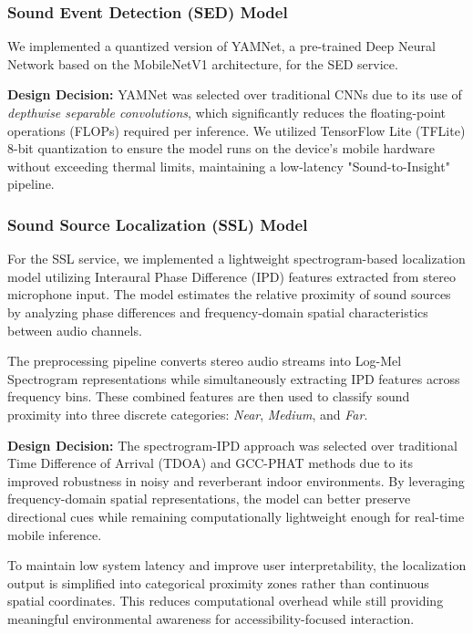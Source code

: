 \subsubsection{Sound Event Detection (SED) Model}
We implemented a quantized version of YAMNet, a pre-trained Deep Neural Network based on the MobileNetV1 architecture, for the SED service. 

\textbf{Design Decision:} YAMNet was selected over traditional CNNs due to its use of \textit{depthwise separable convolutions}, which significantly reduces the floating-point operations (FLOPs) required per inference. We utilized TensorFlow Lite (TFLite) 8-bit quantization to ensure the model runs on the device’s mobile hardware without exceeding thermal limits, maintaining a low-latency "Sound-to-Insight" pipeline.

\subsubsection{Sound Source Localization (SSL) Model}

For the SSL service, we implemented a lightweight spectrogram-based localization model utilizing Interaural Phase Difference (IPD) features extracted from stereo microphone input. 
The model estimates the relative proximity of sound sources by analyzing phase differences and frequency-domain spatial characteristics between audio channels.

The preprocessing pipeline converts stereo audio streams into Log-Mel Spectrogram representations while simultaneously extracting IPD features across frequency bins. 
These combined features are then used to classify sound proximity into three discrete categories: \textit{Near}, \textit{Medium}, and \textit{Far}.

\textbf{Design Decision:} 
The spectrogram-IPD approach was selected over traditional Time Difference of Arrival (TDOA) and GCC-PHAT methods due to its improved robustness in noisy and reverberant indoor environments. 
By leveraging frequency-domain spatial representations, the model can better preserve directional cues while remaining computationally lightweight enough for real-time mobile inference.

To maintain low system latency and improve user interpretability, the localization output is simplified into categorical proximity zones rather than continuous spatial coordinates. 
This reduces computational overhead while still providing meaningful environmental awareness for accessibility-focused interaction.
